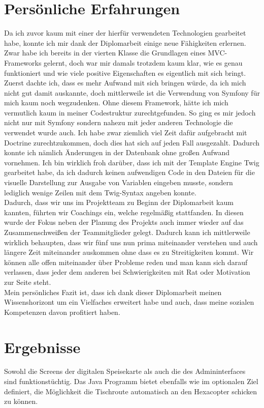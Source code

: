 \chapter{Persönliche Erfahrungen}
Da ich zuvor kaum mit einer der hierfür verwendeten Technologien gearbeitet habe, konnte ich mir dank der Diplomarbeit einige neue Fähigkeiten erlernen.
Zwar habe ich bereits in der vierten Klasse die Grundlagen eines MVC-Frameworks gelernt, doch war mir damals trotzdem kaum klar, wie es genau funktioniert und wie viele positive Eigenschaften es eigentlich mit sich bringt.
Zuerst dachte ich, dass es mehr Aufwand mit sich bringen würde, da ich mich nicht gut damit auskannte, doch mittlerweile ist die Verwendung von Symfony für mich kaum noch wegzudenken. Ohne diesem Framework, hätte ich mich vermutlich kaum in meiner Codestruktur zurechtgefunden.
So ging es mir jedoch nicht nur mit Symfony sondern nahezu mit jeder anderen Technologie die verwendet wurde auch. 
Ich habe zwar ziemlich viel Zeit dafür aufgebracht mit Doctrine zurechtzukommen, doch dies hat sich auf jeden Fall ausgezahlt. Dadurch konnte ich nämlich Änderungen in der Datenbank ohne großen Aufwand vornehmen. 
Ich bin wirklich froh darüber, dass ich mit der Template Engine Twig gearbeitet habe, da ich dadurch keinen aufwendigen Code in den Dateien für die visuelle Darstellung zur Ausgabe von Variablen eingeben musste, sondern lediglich wenige Zeilen mit dem Twig-Syntax angeben konnte.
\\
Dadurch, dass wir uns im Projektteam zu Beginn der Diplomarbeit kaum kannten, führten wir Coachings ein, welche regelmäßig stattfanden. In diesen wurde der Fokus neben der Planung des Projekts auch immer wieder auf das Zusammenschweißen der Teammitglieder gelegt. Dadurch kann ich mittlerweile wirklich behaupten, dass wir fünf uns nun prima miteinander verstehen und auch längere Zeit miteinander auskommen ohne dass es zu Streitigkeiten kommt. Wir können alle offen miteinander über Probleme reden und man kann sich darauf verlassen, dass jeder dem anderen bei Schwierigkeiten mit Rat oder Motivation zur Seite steht.
\\
Mein persönliches Fazit ist, dass ich dank dieser Diplomarbeit meinen Wissenshorizont um ein Vielfaches erweitert habe und auch, dass meine sozialen Kompetenzen davon profitiert haben. 

\chapter{Ergebnisse}
Sowohl die Screens der digitalen Speisekarte als auch die des Admininterfaces sind funktionstüchtig.
Das Java Programm bietet ebenfalls wie im optionalen Ziel definiert, die Möglichkeit die Tischroute automatisch an den Hexacopter schicken zu können.
